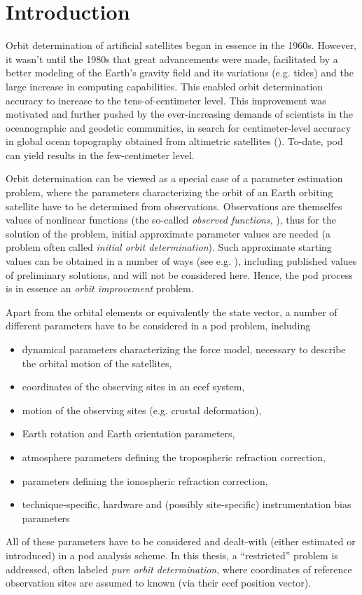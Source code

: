 \section{Introduction}\label{sec:pod-introduction}

Orbit determination of artificial satellites began in essence in the 1960s. However, 
it wasn't until the 1980s that great advancements were made, facilitated by
a better modeling of the Earth's gravity field and its variations (e.g. tides) and
the large increase in computing capabilities. This enabled orbit determination 
accuracy to increase to the tens-of-centimeter level. This improvement was
motivated and further pushed by the ever-increasing demands of scientists in the 
oceanographic and geodetic communities, in search for centimeter-level accuracy 
in global ocean topography obtained from altimetric satellites (\cite{Tapley2004}).
To-date, \gls{pod} can yield results in the  few-centimeter level.

Orbit determination can be viewed as a special case of a parameter estimation problem, 
where the parameters characterizing the orbit of an Earth orbiting satellite have to be 
determined from observations. Observations are themselfes values of nonlinear functions 
(the so-called \emph{observed functions}, \cite{BeutlerVII}), thus for the solution 
of the problem, initial approximate parameter values are needed (a problem often 
called \emph{initial orbit determination}). Such approximate starting values can be 
obtained in a number of ways (see e.g. \cite{Vallado2001}), including published 
values of preliminary solutions, and will not be considered here. Hence, the \gls{pod}
process is in essence an \emph{orbit improvement} problem.

Apart from the orbital elements or equivalently the state vector, a number of
different parameters have to be considered in a \gls{pod} problem, including
\begin{itemize}
    \item dynamical parameters characterizing the force model, necessary to describe 
        the orbital motion of the satellites,
    \item coordinates of the observing sites in an \gls{ecef} system,
    \item motion of the observing sites (e.g. crustal deformation),
    \item Earth rotation and Earth orientation parameters,
    \item atmosphere parameters defining the tropospheric refraction correction,
    \item parameters defining the ionospheric refraction correction,
    \item technique-specific, hardware and (possibly site-specific) instrumentation
        bias parameters
\end{itemize}
All of these parameters have to be considered and dealt-with (either estimated or 
introduced) in a \gls{pod} analysis scheme. In this thesis, a ``restricted'' problem 
is addressed, often labeled \emph{pure orbit determination}, where coordinates of 
reference observation sites are assumed to known (via their \gls{ecef} position vector).

